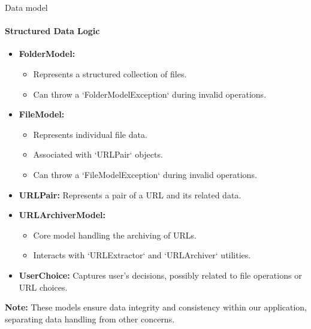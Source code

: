 \documentclass[
    ngerman,%
    authorontitle=true,
]{bfhbeamer}
\begin{document}
    \begin{frame}{Data model}
        \framesubtitle{Structured Data Logic}
        \begin{itemize}
            \item \textbf{FolderModel:}
            \begin{itemize}
                \item Represents a structured collection of files.
                \item Can throw a `FolderModelException` during invalid operations.
            \end{itemize}

            \item \textbf{FileModel:}
            \begin{itemize}
                \item Represents individual file data.
                \item Associated with `URLPair` objects.
                \item Can throw a `FileModelException` during invalid operations.
            \end{itemize}

            \item \textbf{URLPair:} Represents a pair of a URL and its related data.

            \item \textbf{URLArchiverModel:}
            \begin{itemize}
                \item Core model handling the archiving of URLs.
                \item Interacts with `URLExtractor` and `URLArchiver` utilities.
            \end{itemize}

            \item \textbf{UserChoice:} Captures user's decisions, possibly related to file operations or URL choices.

        \end{itemize}

        \textbf{Note:} These models ensure data integrity and consistency within our application, separating data handling from other concerns.

    \end{frame}
\end{document}
